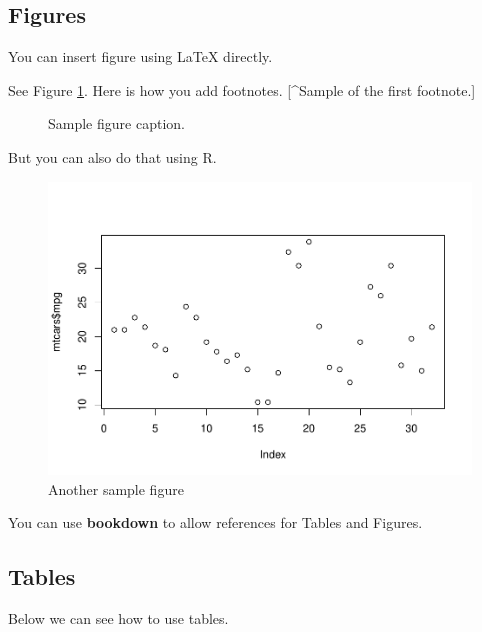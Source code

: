 \documentclass{article}
\begin{document}
\hypertarget{figures}{%
\subsection{Figures}\label{figures}}

You can insert figure using LaTeX directly.

See Figure \ref{fig:fig1}. Here is how you add footnotes. {[}\^{}Sample
of the first footnote.{]}

\begin{figure}
  \centering
  \fbox{\rule[-.5cm]{4cm}{4cm} \rule[-.5cm]{4cm}{0cm}}
  \caption{Sample figure caption.}
  \label{fig:fig1}
\end{figure}

But you can also do that using R.

\begin{figure}

{\centering \includegraphics{assessing-the-role-of-dopamine-on-the-formation-of-contextually-relevant-visual-routines_files/figure-latex/fig2-1} 

}

\caption{Another sample figure}\label{fig:fig2}
\end{figure}

You can use \textbf{bookdown} to allow references for Tables and
Figures.

\hypertarget{tables}{%
\subsection{Tables}\label{tables}}

Below we can see how to use tables.
\end{document}
